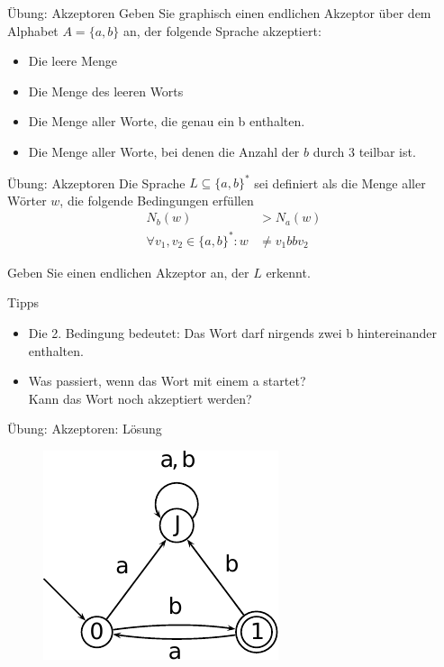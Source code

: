 
\begin{frame}{Übung: Akzeptoren}
	Geben Sie graphisch einen endlichen Akzeptor über dem Alphabet $A=\{a,b\}$ an, der folgende Sprache akzeptiert:
	\begin{itemize}
		\item Die leere Menge
		\item Die Menge des leeren Worts
		\item Die Menge aller Worte, die genau ein b enthalten.
		\item Die Menge aller Worte, bei denen die Anzahl der $b$ durch 3 teilbar ist.
	\end{itemize}
\end{frame}

\begin{frame}{Übung: Akzeptoren}
	Die Sprache $L\subseteq \{a,b\}^\ast $ sei definiert als die Menge aller Wörter $w$, die folgende Bedingungen erfüllen 
	\begin{align*}
		N_b(w) &> N_a(w)\\ 
		\forall v_1,v_2 \in \{a,b\}^\ast : w &\neq v_1 bb v_2 
	\end{align*}
	
	Geben Sie einen endlichen Akzeptor an, der $L$ erkennt. \\
	
	\bigskip
	\pause
	\begin{block}{Tipps}
		\begin{itemize}[<+->]
			\item Die 2. Bedingung bedeutet: Das Wort darf nirgends zwei b hintereinander enthalten.
			\item Was passiert, wenn das Wort mit einem a startet?\\
				  Kann das Wort noch akzeptiert werden?
		\end{itemize}
	\end{block}
\end{frame}

\begin{frame}{Übung: Akzeptoren: Lösung}
	\begin{figure}
		\centering
		\includegraphics[width=0.7\linewidth]{automaten/Loesung2.pdf}
	\end{figure}
\end{frame}

